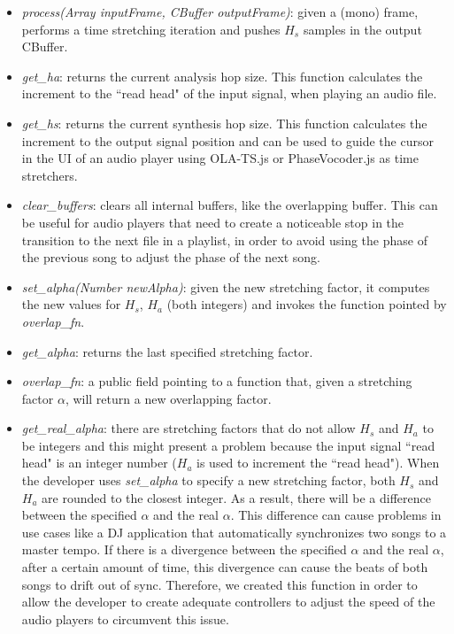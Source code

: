 \documentclass{sig-alternate}
\begin{document}
\begin{sloppypar}
\begin{itemize}
	\item \textit{process(Array inputFrame, CBuffer outputFrame)}: given a (mono) frame, performs a time stretching iteration and pushes $H_s$ samples in the output CBuffer.
	\item \textit{get\_ha}: returns the current analysis hop size. This function calculates the increment to the ``read head" of the input signal, when playing an audio file.
	\item \textit{get\_hs}: returns the current synthesis hop size. This function calculates the increment to the output signal position and can be used to guide the cursor in the UI of an audio player using OLA-TS.js or PhaseVocoder.js as time stretchers.
	\item \textit{clear\_buffers}: clears all internal buffers, like the overlapping buffer. This can be useful for audio players that need to create a noticeable stop in the transition to the next file in a playlist, in order to avoid using the phase of the previous song to adjust the phase of the next song.
	\item \textit{set\_alpha(Number newAlpha)}: given the new stretching factor, it computes the new values for $H_s$, $H_a$ (both integers) and invokes the function pointed by \textit{overlap\_fn}.
	\item \textit{get\_alpha}: returns the last specified stretching factor.
	\item \textit{overlap\_fn}: a public field pointing to a function that, given a stretching factor $\alpha$, will return a new overlapping factor.
	\item \textit{get\_real\_alpha}: there are stretching factors that do not allow $H_s$ and $H_a$ to be integers and this might present a problem because the input signal ``read head" is an integer number ($H_a$ is used to increment the ``read head"). When the developer uses \textit{set\_alpha} to specify a new stretching factor, both $H_s$ and $H_a$ are rounded to the closest integer. As a result, there will be a difference between the specified $\alpha$ and the real $\alpha$. This difference can cause problems in use cases like a DJ application that automatically synchronizes two songs to a master tempo. If there is a divergence between the specified $\alpha$ and the real $\alpha$, after a certain amount of time, this divergence can cause the beats of both songs to drift out of sync. Therefore, we created this function in order to allow the developer to create adequate controllers to adjust the speed of the audio players to circumvent this issue. 
\end{itemize}


\end{sloppypar}
\end{document}
